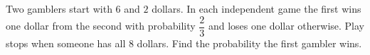 Two gamblers start with $6$ and $2$ dollars. In each independent game the first wins one dollar from the second with probability $\dfrac{2}{3}$ and loses one dollar otherwise. Play stops when someone has all $8$ dollars. Find the probability the first gambler wins.
